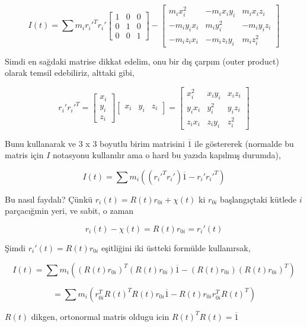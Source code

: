 \documentclass[12pt,fleqn]{article}\usepackage{../../common}
\begin{document}
$$
I(t) = \sum
m_i r_i'^T r_i' \left[\begin{array}{ccc}
1 & 0 & 0 \\ 
0 & 1 & 0 \\ 
0 & 0 & 1 
\end{array}\right] -
\left[\begin{array}{ccc}
m_i x_i^2 & -m_i x_i y_i & m_i x_i z_i \\
-m_i y_i x_i & m_i y_i^2 & -m_i y_i z_i \\
-m_i z_i x_i & -m_i z_i y_i & m_i z_i^2
\end{array}\right]
$$

Simdi en sağdaki matrise dikkat edelim, onu bir dış çarpım (outer product)
olarak temsil edebiliriz, alttaki gibi,

$$
r_i' r_i'^T = \left[\begin{array}{c}
x_i \\ y_i \\ z_i
\end{array}\right]
\left[\begin{array}{ccc}
x_i & y_i & z_i
\end{array}\right] =
\left[\begin{array}{ccc}
x_i^2 &  x_i y_i &  x_i z_i \\
y_i x_i & y_i^2 & y_i z_i \\
z_i x_i & z_i y_i & z_i^2
\end{array}\right]
$$

Bunu kullanarak ve 3 x 3 boyutlu birim matrisini $\overline{1}$ ile göstererek
(normalde bu matris için $I$ notasyonu kullanılır ama o hard bu yazıda
kapılmış durumda),

$$
I(t) = \sum m_i ((r_i'^T r_i') \overline{1} - r_i' r_i'^T)
$$

Bu nasıl faydalı? Çünkü $r_i(t) = R(t) r_{0i} + \chi(t)$ ki $r_{0i}$ başlangıçtaki
kütlede $i$ parçacığınin yeri, ve sabit, o zaman

$$
r_i(t) - \chi(t) = R(t) r_{0i} = r_i'(t)
$$

Şimdi $r_i'(t) = R(t) r_{0i}$ eşitliğini iki üstteki formülde kullanırsak,

$$
I(t) = \sum
m_i ( (R(t) r_{0i})^T  (R(t) r_{0i})  \overline{1} -  (R(t) r_{0i})  (R(t) r_{0i})^T  )
$$

$$
= \sum
m_i ( r_{0i}^T R(t)^T R(t) r_{0i} \overline{1} -  R(t) r_{0i} r_{0i}^T R(t)^T )
$$

$R(t)$ dikgen, ortonormal matris oldugu icin $R(t)^TR(t) = \overline{1}$
\end{document}
